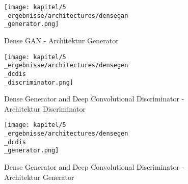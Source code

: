 \begin{figure}[H]
	\centering
	\texttt{[image: kapitel/5\\\_ergebnisse/architectures/densegan\\\_generator.png]}
	\caption{Dense GAN - Architektur Generator}
	\label{architecture:densegan-gen}
\end{figure}

\begin{figure}[H]
	\centering
	\texttt{[image: kapitel/5\\\_ergebnisse/architectures/densegen\\\_dcdis\\\_discriminator.png]}
	\caption{Dense Generator and Deep Convolutional Discriminator - Architektur Discriminator}
	\label{architecture:densegen-dcdis-dis}
\end{figure}

\begin{figure}[H]
	\centering
	\texttt{[image: kapitel/5\\\_ergebnisse/architectures/densegen\\\_dcdis\\\_generator.png]}
	\caption{Dense Generator and Deep Convolutional Discriminator - Architektur Generator}
	\label{architecture:densegen-dcdis-gen}
\end{figure}
